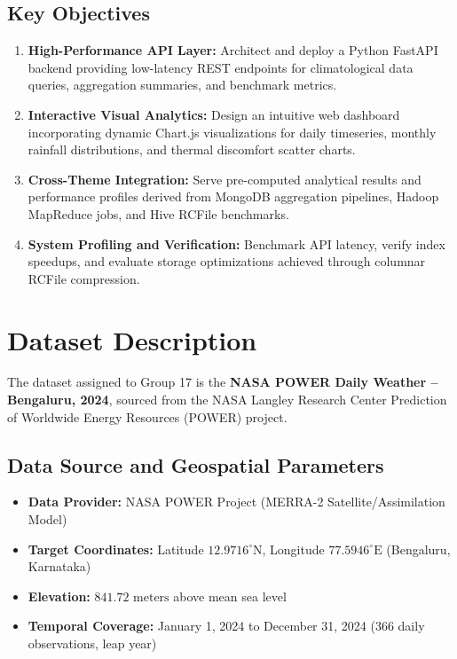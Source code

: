 \documentclass[12pt,a4paper]{article}
\begin{document}
\subsection{Key Objectives}
\begin{enumerate}
    \item \textbf{High-Performance API Layer:} Architect and deploy a Python FastAPI backend providing low-latency REST endpoints for climatological data queries, aggregation summaries, and benchmark metrics.
    \item \textbf{Interactive Visual Analytics:} Design an intuitive web dashboard incorporating dynamic Chart.js visualizations for daily timeseries, monthly rainfall distributions, and thermal discomfort scatter charts.
    \item \textbf{Cross-Theme Integration:} Serve pre-computed analytical results and performance profiles derived from MongoDB aggregation pipelines, Hadoop MapReduce jobs, and Hive RCFile benchmarks.
    \item \textbf{System Profiling and Verification:} Benchmark API latency, verify index speedups, and evaluate storage optimizations achieved through columnar RCFile compression.
\end{enumerate}

\section{Dataset Description}

The dataset assigned to Group 17 is the \textbf{NASA POWER Daily Weather -- Bengaluru, 2024}, sourced from the NASA Langley Research Center Prediction of Worldwide Energy Resources (POWER) project.

\subsection{Data Source and Geospatial Parameters}
\begin{itemize}
    \item \textbf{Data Provider:} NASA POWER Project (MERRA-2 Satellite/Assimilation Model)
    \item \textbf{Target Coordinates:} Latitude $12.9716^\circ\text{N}$, Longitude $77.5946^\circ\text{E}$ (Bengaluru, Karnataka)
    \item \textbf{Elevation:} $841.72\text{ meters}$ above mean sea level
    \item \textbf{Temporal Coverage:} January 1, 2024 to December 31, 2024 (366 daily observations, leap year)
\end{itemize}
\end{document}
